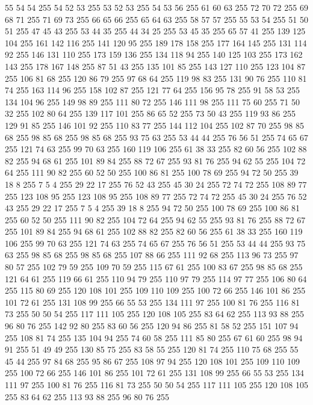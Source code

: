 55 54 54 255 54 52 53 255 53 52 53 255 54 53 56 255 61 60 63 255 72 70 72 255 69 68 71 255 71 69 73 255 66 65 66 255 65 64 63 255 58 57 57 255 55 53 54 255 51 50 51 255 47 45 43 255 53 44 35 255 44 34 25 255 53 45 35 255 65 57 41 255 139 125 104 255 161 142 116 255 141 120 95 255 189 178 158 255 177 164 145 255 131 114 92 255 146 131 110 255 173 159 136 255 134 118 94 255 140 125 103 255 173 162 143 255 178 167 148 255 87 51 43 255 135 101 85 255 143 127 110 255 123 104 87 255 106 81 68 255 120 86 79 255 97 68 64 255 119 98 83 255 131 90 76 255 110 81 74 255 163 114 96 255 158 102 87 255 121 77 64 255 156 95 78 255 91 58 53 255 134 104 96 255 149 98 89 255 111 80 72 255 146 111 98 255 111 75 60 255 71 50 32 255 102 80 64 255 139 117 101 255 86 65 52 255 73 50 43 255 119 93 86 255 129 91 85 255 146 101 92 255 110 83 77 255 144 112 104 255 102 87 70 255 98 85 68 255 98 85 68 255 98 85 68 255
93 75 63 255 53 44 44 255 76 56 51 255 74 65 67 255 121 74 63 255 99 70 63 255 160 119 106 255 61 38 33 255 82 60 56 255 102 88 82 255 94 68 61 255 101 89 84 255 88 72 67 255 93 81 76 255 94 62 55 255 104 72 64 255 111 90 82 255 60 52 50 255 100 86 81 255 100 78 69 255 94 72 50 255 39 18 8 255 7 5 4 255 29 22 17 255 76 52 43 255 45 30 24 255 72 74 72 255 108 89 77 255 123 108 95 255 123 108 95 255 108 89 77 255 72 74 72 255 45 30 24 255 76 52 43 255 29 22 17 255 7 5 4 255 39 18 8 255 94 72 50 255 100 78 69 255 100 86 81 255 60 52 50 255 111 90 82 255 104 72 64 255 94 62 55 255 93 81 76 255 88 72 67 255 101 89 84 255 94 68 61 255 102 88 82 255 82 60 56 255 61 38 33 255 160 119 106 255 99 70 63 255 121 74 63 255 74 65 67 255 76 56 51 255 53 44 44 255 93 75 63 255 98 85 68 255 98 85 68 255 107 88 66 255 111 92 68 255 113 96 73 255 97 80 57 255
102 79 59 255 109 70 59 255 115 67 61 255 100 83 67 255 98 85 68 255 121 64 61 255 119 66 61 255 110 94 79 255 110 97 79 255 114 97 77 255 106 80 64 255 115 80 69 255 120 108 101 255 109 110 109 255 100 72 66 255 146 101 86 255 101 72 61 255 131 108 99 255 66 55 53 255 134 111 97 255 100 81 76 255 116 81 73 255 50 50 54 255 117 111 105 255 120 108 105 255 83 64 62 255 113 93 88 255 96 80 76 255 142 92 80 255 83 60 56 255 120 94 86 255 81 58 52 255 151 107 94 255 108 81 74 255 135 104 94 255 74 60 58 255 111 85 80 255 67 61 60 255 98 94 91 255 51 49 49 255 130 85 75 255 83 58 55 255 120 81 74 255 110 75 68 255 55 45 44 255 97 84 68 255 95 86 67 255 108 97 94 255 120 108 101 255 109 110 109 255 100 72 66 255 146 101 86 255 101 72 61 255 131 108 99 255 66 55 53 255 134 111 97 255 100 81 76 255 116 81 73 255 50 50 54 255 117 111 105 255 120 108 105 255 83 64 62 255 113 93 88 255 96 80 76 255
